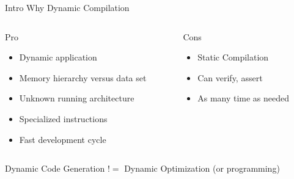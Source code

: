 %
\begin{Frame}{Intro Why Dynamic Compilation}
  \begin{columns}[t]
    \begin{column}{\BW} %
      \begin{block}{Pro}
        \begin{itemize}
        \item Dynamic application
        \item Memory hierarchy versus data set
        \item Unknown running architecture
        \item Specialized instructions
        \item Fast development cycle
        \end{itemize}
      \end{block} 
    \end{column}
    
    \begin{column}{\BW} %
      \begin{block}{Cons}
        \begin{itemize}
        \item Static Compilation
        \item Can verify, assert
        \item As many time as needed
        \end{itemize}
      \end{block}   
    \end{column}
  \end{columns}  
Dynamic Code Generation $!=$ Dynamic Optimization (or programming)
\end{Frame}



